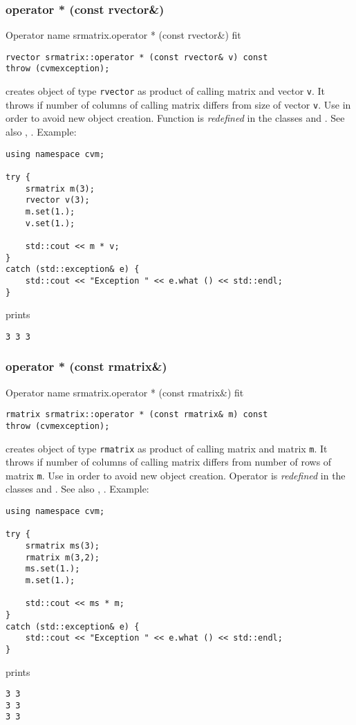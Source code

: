 \subsubsection{operator * (const rvector\&)}
Operator%
\pdfdest name {srmatrix.operator * (const rvector&)} fit
\begin{verbatim}
rvector srmatrix::operator * (const rvector& v) const
throw (cvmexception);
\end{verbatim}
creates  object of type \verb"rvector"
as  product of  calling matrix and  vector \verb"v".
It throws  
if  number of columns of  calling matrix
differs from  size of  vector \verb"v".
Use 
in order to avoid new object creation.
Function is \emph{redefined} in the classes
and .
See also
, .
Example:
\begin{Verbatim}
using namespace cvm;

try {
    srmatrix m(3);
    rvector v(3);
    m.set(1.);
    v.set(1.);

    std::cout << m * v;
}
catch (std::exception& e) {
    std::cout << "Exception " << e.what () << std::endl;
}
\end{Verbatim}
prints
\begin{Verbatim}
3 3 3
\end{Verbatim}
\newpage



\subsubsection{operator * (const rmatrix\&)}
Operator%
\pdfdest name {srmatrix.operator * (const rmatrix&)} fit
\begin{verbatim}
rmatrix srmatrix::operator * (const rmatrix& m) const
throw (cvmexception);
\end{verbatim}
creates  object of type \verb"rmatrix"
as  product of  calling matrix and  matrix \verb"m".
It throws  
if  number of columns of  calling matrix
differs from  number of rows of  matrix \verb"m".
Use  in order to avoid
 new object creation.
Operator is \emph{redefined} in the classes
and .
See also
, .
Example:
\begin{Verbatim}
using namespace cvm;

try {
    srmatrix ms(3);
    rmatrix m(3,2);
    ms.set(1.);
    m.set(1.);

    std::cout << ms * m;
}
catch (std::exception& e) {
    std::cout << "Exception " << e.what () << std::endl;
}
\end{Verbatim}
prints
\begin{Verbatim}
3 3
3 3
3 3
\end{Verbatim}
\newpage




